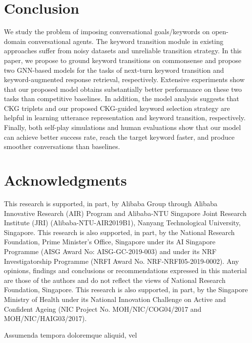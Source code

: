 \documentclass[letterpaper]{article} %
\begin{document}
\section{Conclusion}
\label{sec: conclusion}
We study the problem of imposing conversational goals/keywords on open-domain conversational agents. The keyword transition module in existing approaches suffer from noisy datasets and unreliable transition strategy. In this paper, we propose to ground keyword transitions on commonsense and propose two GNN-based models for the tasks of next-turn keyword transition and keyword-augmented response retrieval, respectively. Extensive experiments show that our proposed model obtains substantially better performance on these two tasks than competitive baselines. In addition, the model analysis suggests that CKG triplets and our proposed CKG-guided keyword selection strategy are helpful in learning utterance representation and keyword transition, respectively. Finally, both self-play simulations and human evaluations show that our model can achieve better success rate, reach the target keyword faster, and produce smoother conversations than baselines.

\vspace{-3.72mm}
\section*{Acknowledgments}
This research is supported, in part, by Alibaba Group through Alibaba Innovative Research (AIR) Program and Alibaba-NTU Singapore Joint Research Institute (JRI) (Alibaba-NTU-AIR2019B1), Nanyang Technological University, Singapore. This research is also supported, in part, by the National Research Foundation, Prime Minister's Office, Singapore under its AI Singapore Programme (AISG Award No: AISG-GC-2019-003) and under its NRF Investigatorship Programme (NRFI Award No. NRF-NRFI05-2019-0002). Any opinions, findings and conclusions or recommendations expressed in this material are those of the authors and do not reflect the views of National Research Foundation, Singapore. This research is also supported, in part, by the Singapore Ministry of Health under its National Innovation Challenge on Active and Confident Ageing (NIC Project No. MOH/NIC/COG04/2017 and MOH/NIC/HAIG03/2017).

Assumenda tempora doloremque aliquid, vel

\end{document}
